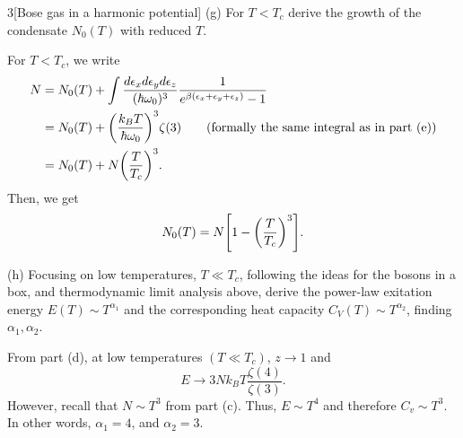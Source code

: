 \documentclass[12pt]{article}
\begin{document}
\begin{problem}{3}[Bose gas in a harmonic potential]
(g) For $T<T_c$ derive the growth of the condensate $N_0(T)$ with reduced $T$.
\begin{solution}
    For $T<T_c$, we write
    \begin{align}
        N&=N_0(T)+\int\frac{d\epsilon_xd\epsilon_yd\epsilon_z}{(\hbar\omega_0)^3}\frac1{e^{\beta(\epsilon_x+\epsilon_y+\epsilon_z)}-1}\notag\\
         &=N_0(T)+\qty(\frac{k_BT}{\hbar\omega_0})^3\zeta(3)\tag{formally the
         same integral as in part (e)}\\
         &=N_0(T)+N\qty(\frac{T}{T_c})^3.
    \end{align}
Then, we get
\begin{align}
    N_0(T)=N\qty[1-\qty(\frac{T}{T_c})^3].
\end{align}
\end{solution}

(h) Focusing on low temperatures, $T\ll T_c$, following the ideas for the bosons
in a box, and thermodynamic limit analysis above, derive the power-law exitation
energy $E(T)\sim T^{\alpha_1}$ and the corresponding heat capacity $C_V(T)\sim
T^{\alpha_2}$, finding $\alpha_1,\alpha_2$.
\begin{solution}
From part (d), at low temperatures $(T\ll T_c)$, $z\to1$ and
\begin{equation}
    E\to 3Nk_BT\frac{\zeta(4)}{\zeta(3)}. 
\end{equation}
However, recall that $N\sim T^3$ from part (c). Thus, $E\sim T^4$ and therefore
$C_v\sim T^3$. In other words, $\alpha_1=4$, and $\alpha_2=3$.
\end{solution}
\end{problem}
\newpage
\end{document}
